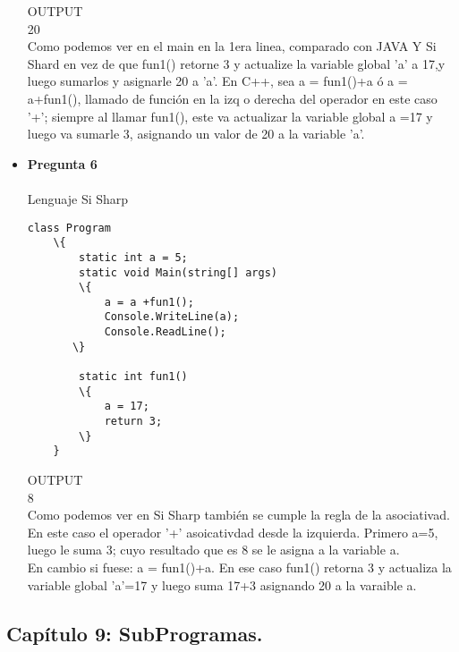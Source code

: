 \documentclass[12pt,oneside]{article}
\begin{document}
\begin{itemize}
OUTPUT\\
20\\
Como podemos ver en el main en la 1era linea, comparado con JAVA Y Si Shard en vez de que fun1() retorne 3 y actualize la variable global 'a' a 17,y luego sumarlos y asignarle 20 a 'a'. En C++, sea a = fun1()+a  ó  a = a+fun1(), llamado de función en la izq o derecha del operador en este caso '+'; siempre al llamar fun1(), este va actualizar la variable global a =17 y luego va sumarle 3, asignando un valor de 20 a  la variable 'a'. 


\item {\bf Pregunta 6} \\\\
Lenguaje Si Sharp\\
\begin{lstlisting}[frame=single]  % Start your code-block
class Program
    \{
        static int a = 5;
        static void Main(string[] args)
        \{
            a = a +fun1();
            Console.WriteLine(a);
            Console.ReadLine();
       \}

        static int fun1()
        \{
            a = 17;
            return 3;
        \}
    }
\end{lstlisting}
OUTPUT\\
8\\ 
Como podemos ver en Si Sharp también se cumple la regla de la asociativad. En este caso el operador '+' asoicativdad desde la izquierda. Primero a=5, luego le suma 3; cuyo resultado que es 8 se le asigna a la variable a.\\
En cambio si fuese:  a = fun1()+a. En ese caso fun1() retorna 3 y actualiza la variable global 'a'=17 y luego suma 17+3 asignando 20 a la varaible a.


\end{itemize}

\subsection{Capítulo 9: SubProgramas.}

%

        




\end{document}

